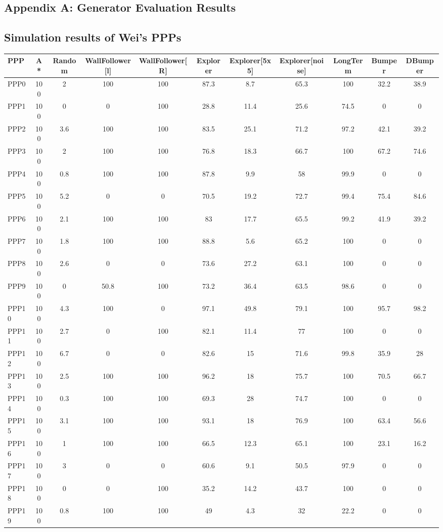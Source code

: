 \documentclass[authoryearcitations]{UoYCSproject}
\begin{document}
\begin{appendices}
\chapter{Appendix A: Generator Evaluation Results}
\label{cha:gen_eval_appendix}

\section{Simulation results of Wei's PPPs}
\begin{table}
\begin{tabular}{|l|c|c|c|c|c|c|c|c|c|c}
PPP	& A* & Random & WallFollower[l] & WallFollower[R] & Explorer& Explorer[5x5] & Explorer[noise] & LongTerm & Bumper & DBumper \\
\hline
PPP0&100&2&100&100&87.3&8.7&65.3&100&32.2&38.9\\
PPP1&100&0&0&100&28.8&11.4&25.6&74.5&0&0\\
PPP2&100&3.6&100&100&83.5&25.1&71.2&97.2&42.1&39.2\\
PPP3&100&2&100&100&76.8&18.3&66.7&100&67.2&74.6\\
PPP4&100&0.8&100&100&87.8&9.9&58&99.9&0&0\\
PPP5&100&5.2&0&0&70.5&19.2&72.7&99.4&75.4&84.6\\
PPP6&100&2.1&100&100&83&17.7&65.5&99.2&41.9&39.2\\
PPP7&100&1.8&100&100&88.8&5.6&65.2&100&0&0\\
PPP8&100&2.6&0&0&73.6&27.2&63.1&100&0&0\\
PPP9&100&0&50.8&100&73.2&36.4&63.5&98.6&0&0\\
PPP10&100&4.3&100&0&97.1&49.8&79.1&100&95.7&98.2\\
PPP11&100&2.7&0&100&82.1&11.4&77&100&0&0\\
PPP12&100&6.7&0&0&82.6&15&71.6&99.8&35.9&28\\
PPP13&100&2.5&100&100&96.2&18&75.7&100&70.5&66.7\\
PPP14&100&0.3&100&100&69.3&28&74.7&100&0&0\\
PPP15&100&3.1&100&100&93.1&18&76.9&100&63.4&56.6\\
PPP16&100&1&100&100&66.5&12.3&65.1&100&23.1&16.2\\
PPP17&100&3&0&0&60.6&9.1&50.5&97.9&0&0\\
PPP18&100&0&0&100&35.2&14.2&43.7&100&0&0\\
PPP19&100&0.8&100&100&49&4.3&32&22.2&0&0\\

\end{tabular}
\end{table}
\end{appendices}
\end{document}
